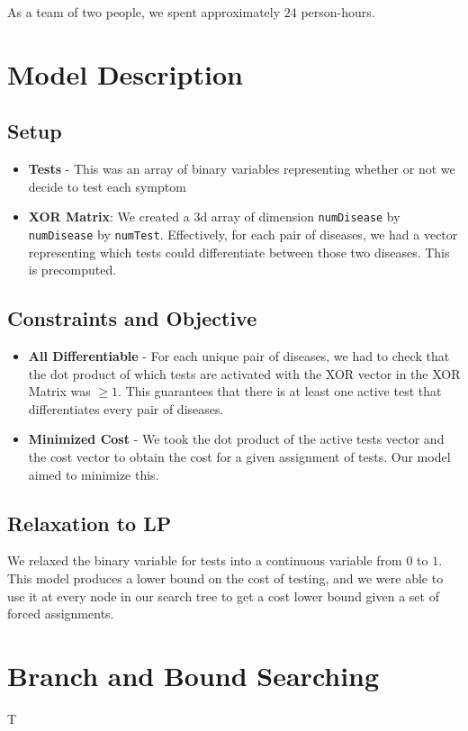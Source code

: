 \documentclass[11pt]{article}
\begin{document}
As a team of two people, we spent approximately $24$ person-hours.
\vspace{-10pt}
\section*{Model Description}
\label{sec:intro}
\subsection*{Setup}
\begin{itemize}
    \item \textbf{Tests} - This was an array of binary variables representing whether or not
    we decide to test each symptom
    \item \textbf{XOR Matrix}: We created a 3d array of dimension \texttt{numDisease} by
    \texttt{numDisease} by \texttt{numTest}. Effectively, for each pair of diseases, we had a vector
    representing which tests could differentiate between those two diseases. This is precomputed.
\end{itemize}

\subsection*{Constraints and Objective}

\begin{itemize}
    \item \textbf{All Differentiable} - For each unique pair of diseases, we had to check that the dot
    product of which tests are activated with the XOR vector in the XOR Matrix was $\geq 1$. This
    guarantees that there is at least one active test that differentiates every pair of diseases.
    \item \textbf{Minimized Cost} - We took the dot product of the active tests vector and the
    cost vector to obtain the cost for a given assignment of tests. Our model aimed to minimize this.
\end{itemize}

\subsection*{Relaxation to LP}
We relaxed the binary variable for tests into a continuous variable from $0$ to $1$. This model 
produces a lower bound on the cost of testing, and we were able to use it at every node in our
search tree to get a cost lower bound given a set of forced assignments.

\section*{Branch and Bound Searching}
T
\end{document}
